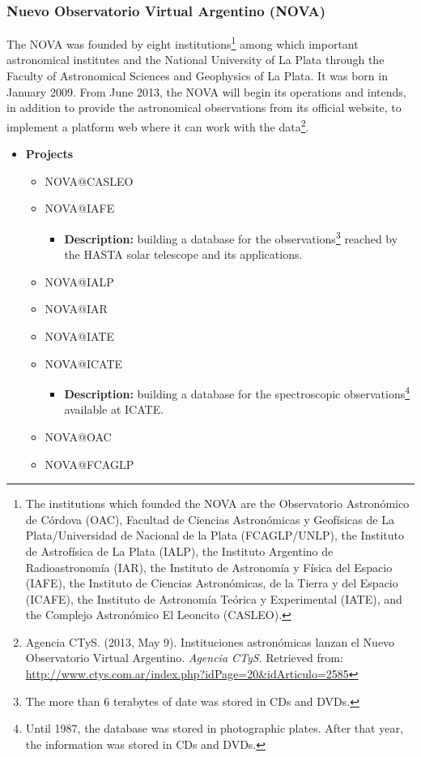 \documentclass[11pt]{article}
\begin{document}
            \subsubsection{Nuevo Observatorio Virtual Argentino (NOVA)}
                The NOVA was founded by eight institutions\footnote{The
institutions which founded the NOVA are the Observatorio Astron\'{o}mico de
C\'{o}rdova (OAC), Facultad de Ciencias Astron\'{o}micas y Geof\'{i}sicas de La
Plata/Universidad de Nacional de la Plata (FCAGLP/UNLP), the Instituto de
Astrof\'{i}sica de La Plata (IALP), the Instituto Argentino de
Radioastronom\'{i}a (IAR), the Instituto de Astronom\'{i}a y F\'{i}sica del
Espacio (IAFE), the Instituto de Ciencias Astron\'{o}micas, de la Tierra y del
Espacio (ICAFE), the Instituto de Astronom\'{i}a Te\'{o}rica y Experimental
(IATE), and the Complejo Astron\'{o}mico El Leoncito (CASLEO).} among which
important astronomical institutes and the National University of La Plata
through the Faculty of Astronomical Sciences and Geophysics of La Plata. It was
born in January 2009. From June 2013, the NOVA will begin its operations and
intends, in addition to provide the astronomical observations from its official
website, to implement a platform web where it can work with the
data\footnote{Agencia CTyS. (2013, May 9). Instituciones astron\'{o}micas lanzan
el Nuevo Observatorio Virtual Argentino. \textit{Agencia CTyS}. Retrieved from:
\url{http://www.ctys.com.ar/index.php?idPage=20&idArticulo=2585}}.

    \begin{itemize}
        \item \textbf{Projects}
            \begin{itemize}
                \item NOVA@CASLEO
                \item NOVA@IAFE
                    \begin{itemize}
                        \item \textbf{Description:} building a database for the
observations\footnote{The more than 6 terabytes of date was stored in CDs and
DVDs.} reached by the HASTA solar telescope and its applications.
                    \end{itemize} 
                \item NOVA@IALP
                \item NOVA@IAR
                \item NOVA@IATE
                \item NOVA@ICATE
                    \begin{itemize}
                        \item \textbf{Description:} building a database for the
spectroscopic observations\footnote{Until 1987, the database was stored in
photographic plates. After that year, the information was stored in CDs and
DVDs.} available at ICATE.
                    \end{itemize}
                \item NOVA@OAC
                \item NOVA@FCAGLP
            \end{itemize}
        \end{itemize}
\end{document}
